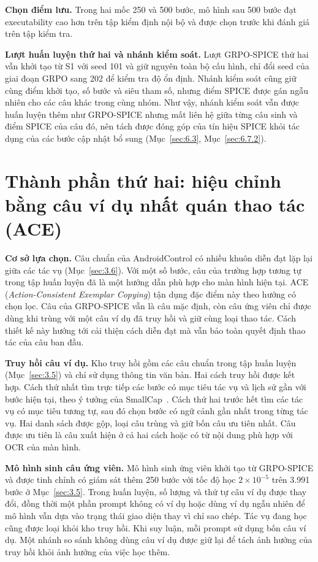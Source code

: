\textbf{Chọn điểm lưu.} Trong hai mốc 250 và 500 bước, mô hình sau 500 bước đạt executability cao hơn trên tập kiểm định nội bộ và được chọn trước khi đánh giá trên tập kiểm tra.

\textbf{Lượt huấn luyện thứ hai và nhánh kiểm soát.} Lượt GRPO-SPICE thứ hai vẫn khởi tạo từ S1 với seed 101 và giữ nguyên toàn bộ cấu hình, chỉ đổi seed của giai đoạn GRPO sang 202 để kiểm tra độ ổn định. Nhánh kiểm soát cũng giữ cùng điểm khởi tạo, số bước và siêu tham số, nhưng điểm SPICE được gán ngẫu nhiên cho các câu khác trong cùng nhóm. Như vậy, nhánh kiểm soát vẫn được huấn luyện thêm như GRPO-SPICE nhưng mất liên hệ giữa từng câu sinh và điểm SPICE của câu đó, nên tách được đóng góp của tín hiệu SPICE khỏi tác dụng của các bước cập nhật bổ sung (Mục~\ref{sec:6.3}, Mục~\ref{sec:6.7.2}).

\section{Thành phần thứ hai: hiệu chỉnh bằng câu ví dụ nhất quán thao tác (ACE)}\label{sec:4.6}

\textbf{Cơ sở lựa chọn.} Câu chuẩn của AndroidControl có nhiều khuôn diễn đạt lặp lại giữa các tác vụ (Mục~\ref{sec:3.6}). Với một số bước, câu của trường hợp tương tự trong tập huấn luyện đã là một hướng dẫn phù hợp cho màn hình hiện tại. ACE (\emph{Action-Consistent Exemplar Copying}) tận dụng đặc điểm này theo hướng có chọn lọc. Câu của GRPO-SPICE vẫn là câu mặc định, còn câu ứng viên chỉ được dùng khi trùng với một câu ví dụ đã truy hồi và giữ cùng loại thao tác. Cách thiết kế này hướng tới cải thiện cách diễn đạt mà vẫn bảo toàn quyết định thao tác của câu ban đầu.

\textbf{Truy hồi câu ví dụ.} Kho truy hồi gồm các câu chuẩn trong tập huấn luyện (Mục~\ref{sec:3.5}) và chỉ sử dụng thông tin văn bản. Hai cách truy hồi được kết hợp. Cách thứ nhất tìm trực tiếp các bước có mục tiêu tác vụ và lịch sử gần với bước hiện tại, theo ý tưởng của SmallCap~\cite{smallcap}. Cách thứ hai trước hết tìm các tác vụ có mục tiêu tương tự, sau đó chọn bước có ngữ cảnh gần nhất trong từng tác vụ. Hai danh sách được gộp, loại câu trùng và giữ bốn câu ưu tiên nhất. Câu được ưu tiên là câu xuất hiện ở cả hai cách hoặc có từ nội dung phù hợp với OCR của màn hình.

\textbf{Mô hình sinh câu ứng viên.} Mô hình sinh ứng viên khởi tạo từ GRPO-SPICE và được tinh chỉnh có giám sát thêm 250 bước với tốc độ học $2 \times 10^{-5}$ trên 3.991 bước ở Mục~\ref{sec:3.5}. Trong huấn luyện, số lượng và thứ tự câu ví dụ được thay đổi, đồng thời một phần prompt không có ví dụ hoặc dùng ví dụ ngẫu nhiên để mô hình vẫn dựa vào trạng thái giao diện thay vì chỉ sao chép. Tác vụ đang học cũng được loại khỏi kho truy hồi. Khi suy luận, mỗi prompt sử dụng bốn câu ví dụ. Một nhánh so sánh không dùng câu ví dụ được giữ lại để tách ảnh hưởng của truy hồi khỏi ảnh hưởng của việc học thêm.

